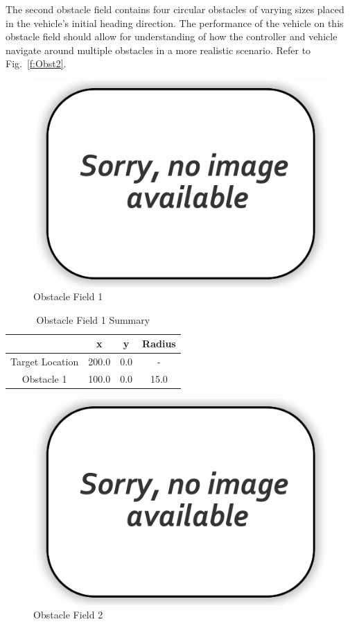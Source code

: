 \documentclass[12pt,twocolumn]{article}
\begin{document}
The second obstacle field contains four circular obstacles of varying sizes placed in the vehicle’s initial heading direction. The performance of the vehicle on this obstacle field should allow for understanding of how the controller and vehicle navigate around multiple obstacles in a more realistic scenario. Refer to Fig.~\ref{f:Obst2}.

\begin{figure}
	\centering
	\includegraphics[width=\columnwidth]{Figs/no-image.png}
	\caption{\small Obstacle Field 1}  
	\label{fig:Obst1}
\end{figure}

\begin{table}
\begin{center}
	\begin{tabular}{||c|c|c|c||} 
		\hline
		& x & y & Radius\\
		\hline
		Target Location  & 200.0 & 0.0 & -\\ 
		\hline
		Obstacle 1 & 100.0 & 0.0 & 15.0\\
		\hline
	\end{tabular}
\end{center}
\caption{Obstacle Field 1 Summary}
\label{t:Obst1Summary}
\end{table}

\begin{figure}
	\centering
	\includegraphics[width=\columnwidth]{Figs/no-image.png}
	\caption{\small Obstacle Field 2}   
	\label{fig:Obst2}
\end{figure}
\end{document}
